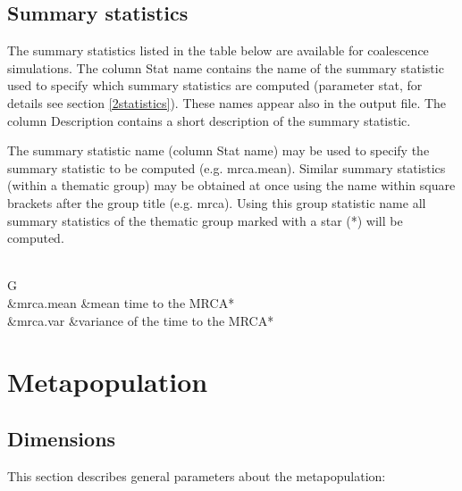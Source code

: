 \documentclass[letterpaper,12pt,oneside]{book}
\begin{document}
\begin{description}
\end{description}

\section{Summary statistics}\label{ssCoal}
The summary statistics listed in the table below are available for coalescence simulations. The column \textsf{Stat name} contains the name of the summary statistic used to specify which summary statistics are computed (parameter \textsf{stat}, for details see section \ref{2statistics}). These names appear also in the output file. The column \textsf{Description} contains a short description of the summary statistic. 

The summary statistic name (column \textsf{Stat name}) may be used to specify the summary statistic to be computed (e.g. \textsf{mrca.mean}). Similar summary statistics (within a thematic group) may be obtained at once using the name within square brackets after the group title (e.g. \textsf{mrca}). Using this group statistic name all summary statistics of the thematic group marked with a star (*) will be computed. 
\\
\\

\begin{supertabular}{G}
\\
 &mrca.mean			&mean time to the MRCA*\\
 &mrca.var			&variance of the time to the MRCA* \\
\end{supertabular}

\newpage
\chapter{Metapopulation}\label{population}
\section{Dimensions}
This section describes general parameters about the metapopulation: 
\end{document}
